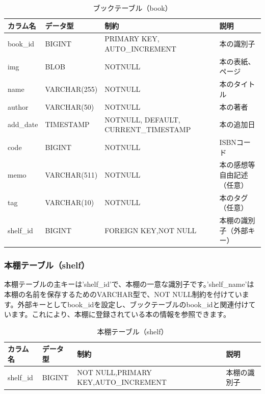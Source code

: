 \documentclass[a4paper, 11pt, titlepage]{jsarticle}
\begin{document}
\begin{table}[htbp]
  \centering
  \begin{tabular}{|l|l|>{\centering\arraybackslash}m{5cm}|>{\centering\arraybackslash}m{3cm}|}
    \hline
    \textbf{カラム名} & \textbf{データ型} & \textbf{制約} & \textbf{説明} \\
    \hline\hline
    book\_id & BIGINT & PRIMARY KEY, AUTO\_INCREMENT & 本の識別子 \\
    \hline
    img & BLOB & NOTNULL & 本の表紙、ページ \\
    \hline
    name & VARCHAR(255) & NOTNULL & 本のタイトル \\
    \hline
    author & VARCHAR(50) & NOTNULL & 本の著者 \\
    \hline
    add\_date & TIMESTAMP & NOTNULL, DEFAULT, CURRENT\_TIMESTAMP & 本の追加日 \\
    \hline
    code & BIGINT & NOTNULL & ISBNコード \\
    \hline
    memo & VARCHAR(511) & NOTNULL & 本の感想等自由記述（任意） \\
    \hline
    tag & VARCHAR(10) & NOTNULL & 本のタグ（任意） \\
    \hline
    shelf\_id & BIGINT & FOREIGN KEY,NOT NULL & 本棚の識別子（外部キー） \\
    \hline
  \end{tabular}
  \caption{ブックテーブル（book）}
  \label{tab:booktable}
\end{table}

\subsubsection{本棚テーブル（shelf）}
本棚テーブルの主キーは'shelf\_id'で、本棚の一意な識別子です。'shelf\_name'は本棚の名前を保存するためのVARCHAR型で、NOT NULL制約を付けています。外部キーとしてbook\_idを設定し、ブックテーブルのbook\_idと関連付けています。これにより、本棚に登録されている本の情報を参照できます。
\begin{table}[htbp]
  \centering
  \begin{tabular}{|l|l|>{\centering\arraybackslash}m{5cm}|>{\centering\arraybackslash}m{3cm}|}
    \hline
    \textbf{カラム名} & \textbf{データ型} & \textbf{制約} & \textbf{説明} \\
    \hline\hline
    shelf\_id & BIGINT & NOT NULL,PRIMARY KEY,AUTO\_INCREMENT& 本棚の識別子 \\
    \hline
  \end{tabular}
  \caption{本棚テーブル（shelf）}
  \label{tab:shelftable}
\end{table}
\end{document}
